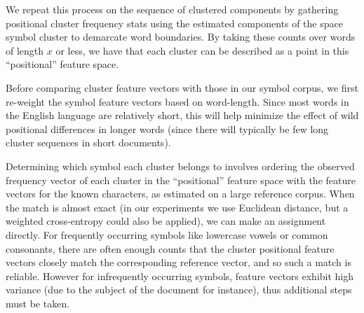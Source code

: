 \documentclass[times, 10pt,twocolumn]{article}
\begin{document}
We repeat this process on the sequence of clustered components by
gathering positional cluster frequency stats using the estimated
components of the space symbol cluster to demarcate word boundaries.
By taking these counts over words of length $x$ or less, we have that
each cluster can be described as a point in this ``positional''
feature space.

Before comparing cluster feature vectors with those in our symbol
corpus, we first re-weight the symbol feature vectors based on
word-length.  Since most words in the English language are relatively
short, this will help minimize the effect of wild positional
differences in longer words (since there will typically be few long
cluster sequences in short documents).

Determining which symbol each cluster belongs to involves ordering the
observed frequency vector of each cluster in the ``positional''
feature space with the feature vectors for the known characters, as
estimated on a large reference corpus. When the match is almost exact
(in our experiments we use Euclidean distance, but a weighted
cross-entropy could also be applied), we can make an assignment
directly.  For frequently occurring symbols like lowercase vowels or
common consonants, there are often enough counts that the cluster
positional feature vectors closely match the corresponding reference
vector, and so such a match is reliable.  However for
infrequently occurring symbols, feature vectors exhibit high variance
(due to the subject of the document for instance), thus additional steps must 
be taken.
\end{document}
